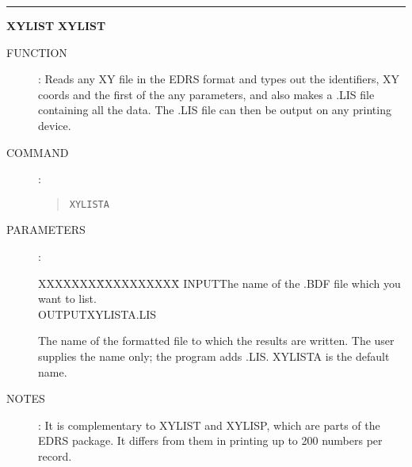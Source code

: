 \goodbreak
\rule{\textwidth}{0.3mm}
{\Large {\bf XYLIST} \hfill {\bf XYLIST}}
\begin{description}
\item [FUNCTION]:
Reads any XY file in the EDRS format and types out the identifiers, XY coords
and the first of the any parameters, and also makes a .LIS file containing all
the data.
The .LIS file can then be output on any printing device.
\item [COMMAND]:
\begin{quote}
{\tt XYLISTA}
\end{quote}
\item [PARAMETERS] :
\begin{tabbing}
XXXXXXX\=XXXXXXXXXX\=\kill
INPUT\>\>The name of the .BDF file which you want to list.\\
OUTPUT\>XYLISTA.LIS\>\begin{minipage}[t]{100mm}
The name of the formatted file to which the results are written.
The user supplies the name only; the program adds .LIS.
XYLISTA is the default name.
\end{minipage}
\end{tabbing}
\item [NOTES]:
It is complementary to XYLIST and XYLISP, which are parts of the EDRS package.
It differs from them in printing up to 200 numbers per record.
\end{description}

